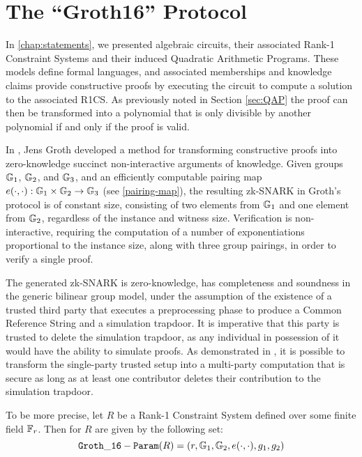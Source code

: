 \section{The ``Groth16'' Protocol}
\label{sec:gorth_16}
 In \chaptname{} \ref{chap:statements}, we presented algebraic circuits, their associated Rank-1 Constraint Systems and their induced Quadratic Arithmetic Programs. These models define formal languages, and associated memberships and knowledge claims provide constructive proofs by executing the circuit to compute a solution to the associated R1CS. As previously noted in Section \ref{sec:QAP} the proof can then be transformed into a polynomial that is only divisible by another polynomial if and only if the proof is valid. 
 
In \cite{Groth16}, Jens Groth developed a method for transforming constructive proofs into zero-knowledge succinct non-interactive arguments of knowledge. Given groups $\mathbb{G}_1$, $\mathbb{G}_2$, and $\mathbb{G}_3$, and an efficiently computable pairing map $e(\cdot,\cdot): \mathbb{G}_1 \times \mathbb{G}_2 \to \mathbb{G}_3$ (see \ref{pairing-map}), the resulting zk-SNARK in Groth's protocol is of constant size, consisting of two elements from $\mathbb{G}_1$ and one element from $\mathbb{G}_2$, regardless of the instance and witness size. Verification is non-interactive, requiring the computation of a number of exponentiations proportional to the instance size, along with three group pairings, in order to verify a single proof.

The generated zk-SNARK is zero-knowledge, has completeness and soundness in the generic bilinear group model, under the assumption of the existence of a trusted third party that executes a preprocessing phase to produce a Common Reference String and a simulation trapdoor. It is imperative that this party is trusted to delete the simulation trapdoor, as any individual in possession of it would have the ability to simulate proofs. As demonstrated in \cite{bowe-17}, it is possible to transform the single-party trusted setup into a multi-party computation that is secure as long as at least one contributor deletes their contribution to the simulation trapdoor. 

To be more precise, let $R$ be a Rank-1 Constraint System defined over some finite field $\mathbb{F}_r$. Then  for $R$ are given by the following set:
\begin{equation}
\label{groth16-parameters}
\mathtt{Groth\_16-Param}(R)=(r, \mathbb{G}_1, \mathbb{G}_2, e(\cdot,\cdot), g_1,g_2)
\end{equation}

